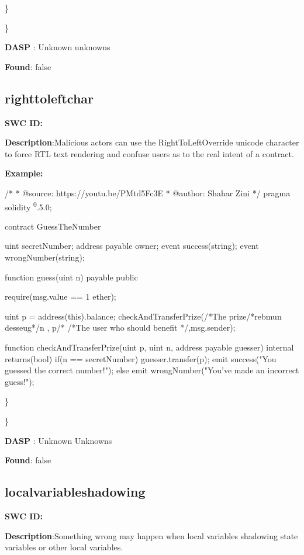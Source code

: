 \documentclass{article}
\begin{document}
\} 

\} 

\textbf{DASP} : Unknown unknowns

\textbf{Found}: false

\subsection{right\textunderscore to\textunderscore left\textunderscore char} 
\textbf{SWC \textunderscore ID:} 

\textbf{Description}:Malicious actors can use the Right\textendash To\textendash Left\textendash Override unicode character to force RTL text rendering and confuse users as to the real intent of a contract.


\textbf{Example:} 

/*
* @source: https://youtu.be/P\textunderscore Mtd5Fc\textunderscore 3E
* @author: Shahar Zini
*/
pragma solidity \textsuperscript0.5.0;

contract GuessTheNumber
{
    uint \textunderscore secretNumber;
    address payable \textunderscore owner;
    event success(string);
event wrongNumber(string);

    function guess(uint n) payable public
    {
        require(msg.value == 1 ether);

        uint p = address(this).balance;
        checkAndTransferPrize(/*The prize/*rebmun desseug*/n , p/*
                /*The user who should benefit */,msg.sender);
    }

    function checkAndTransferPrize(uint p, uint n, address payable guesser) internal returns(bool)
    {
        if(n == \textunderscore secretNumber)
        {
            guesser.transfer(p);
            emit success("You guessed the correct number!");
        }
        else
        {
            emit wrongNumber("You've made an incorrect guess!");
        }
    }
  }

\} 

\} 

\textbf{DASP} : Unknown Unknowns

\textbf{Found}: false

\subsection{local\textunderscore variable\textunderscore shadowing} 
\textbf{SWC \textunderscore ID:} 

\textbf{Description}:Something wrong may happen when local variables shadowing state variables or other local variables.
\end{document}
